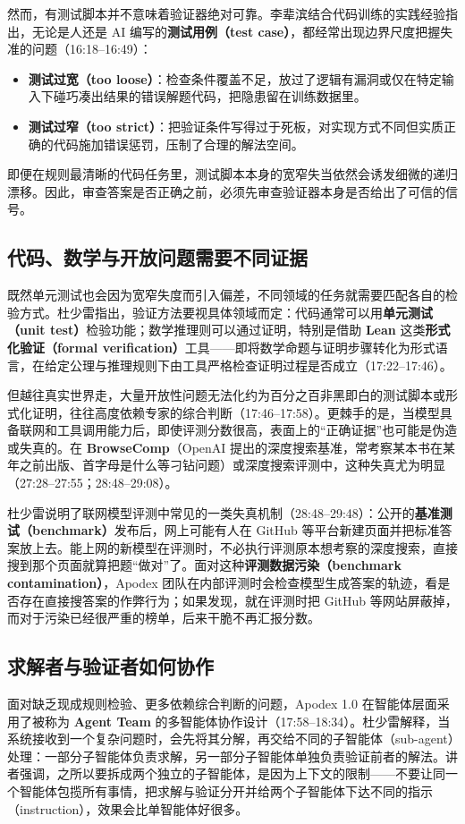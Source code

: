 \documentclass[UTF8,a4paper,11pt,fontset=fandol]{ctexart}
\begin{document}
然而，有测试脚本并不意味着验证器绝对可靠。李辈滨结合代码训练的实践经验指出，无论是人还是 AI 编写的\textbf{测试用例（test case）}，都经常出现边界尺度把握失准的问题（16:18–16:49）：
\begin{itemize}
\item \textbf{测试过宽（too loose）}：检查条件覆盖不足，放过了逻辑有漏洞或仅在特定输入下碰巧凑出结果的错误解题代码，把隐患留在训练数据里。
\item \textbf{测试过窄（too strict）}：把验证条件写得过于死板，对实现方式不同但实质正确的代码施加错误惩罚，压制了合理的解法空间。
\end{itemize}
即便在规则最清晰的代码任务里，测试脚本本身的宽窄失当依然会诱发细微的递归漂移。因此，审查答案是否正确之前，必须先审查验证器本身是否给出了可信的信号。

\subsection{代码、数学与开放问题需要不同证据}
既然单元测试也会因为宽窄失度而引入偏差，不同领域的任务就需要匹配各自的检验方式。杜少雷指出，验证方法要视具体领域而定：代码通常可以用\textbf{单元测试（unit test）}检验功能；数学推理则可以通过证明，特别是借助 \textbf{Lean} 这类\textbf{形式化验证（formal verification）}工具——即将数学命题与证明步骤转化为形式语言，在给定公理与推理规则下由工具严格检查证明过程是否成立（17:22–17:46）。

但越往真实世界走，大量开放性问题无法化约为百分之百非黑即白的测试脚本或形式化证明，往往高度依赖专家的综合判断（17:46–17:58）。更棘手的是，当模型具备联网和工具调用能力后，即使评测分数很高，表面上的“正确证据”也可能是伪造或失真的。在 \textbf{BrowseComp}（OpenAI 提出的深度搜索基准，常考察某本书在某年之前出版、首字母是什么等刁钻问题）或深度搜索评测中，这种失真尤为明显（27:28–27:55；28:48–29:08）。

杜少雷说明了联网模型评测中常见的一类失真机制（28:48–29:48）：公开的\textbf{基准测试（benchmark）}发布后，网上可能有人在 GitHub 等平台新建页面并把标准答案放上去。能上网的新模型在评测时，不必执行评测原本想考察的深度搜索，直接搜到那个页面就算把题“做对”了。面对这种\textbf{评测数据污染（benchmark contamination）}，Apodex 团队在内部评测时会检查模型生成答案的轨迹，看是否存在直接搜答案的作弊行为；如果发现，就在评测时把 GitHub 等网站屏蔽掉，而对于污染已经很严重的榜单，后来干脆不再汇报分数。

\subsection{求解者与验证者如何协作}
面对缺乏现成规则检验、更多依赖综合判断的问题，Apodex 1.0 在智能体层面采用了被称为 \textbf{Agent Team} 的多智能体协作设计（17:58–18:34）。杜少雷解释，当系统接收到一个复杂问题时，会先将其分解，再交给不同的子智能体（sub-agent）处理：一部分子智能体负责求解，另一部分子智能体单独负责验证前者的解法。讲者强调，之所以要拆成两个独立的子智能体，是因为上下文的限制——不要让同一个智能体包揽所有事情，把求解与验证分开并给两个子智能体下达不同的指示（instruction），效果会比单智能体好很多。
\end{document}
